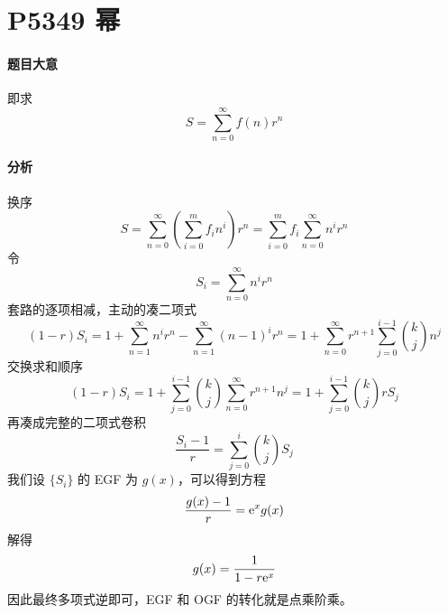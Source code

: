 \section{P5349 幂}

\paragraph{题目大意}

即求
\[ S = \sum_{n=0}^\infty f(n)r^n \]

\paragraph{分析}

换序
\[ S = \sum_{n = 0}^{\infty} \left( \sum_{i = 0}^m f_i n^i \right) r^n
= \sum_{i = 0}^m f_i \sum_{n = 0}^{\infty} n^i r^n \]
令
\[ S_i = \sum_{n = 0}^{\infty} n^i r^n \]
套路的逐项相减，主动的凑二项式
\[ (1 - r) S_i = 1 + \sum_{n = 1}^{\infty} n^i r^n - \sum_{n = 1}^{\infty} (n - 1)^i r^n
= 1 + \sum_{n = 0}^{\infty} r^{n + 1} \sum_{j = 0}^{i - 1} \binom{k}{j} n^j \]
交换求和顺序
\[ (1 - r) S_i = 1 + \sum_{j = 0}^{i - 1} \binom{k}{j} \sum_{n = 0}^{\infty}r^{n + 1} n^j
= 1 + \sum_{j = 0}^{i - 1} \binom{k}{j} r S_j \]
再凑成完整的二项式卷积
\[ \frac{S_i - 1}{r} = \sum_{j = 0}^i \binom{k}{j} S_j \]
我们设 $\{ S_i \}$ 的 EGF 为 $g(x)$，可以得到方程
\[ \frac{g(x) - 1}{r} = {\rm e}^x g(x) \]
解得
\[ g(x) = \frac{1}{1 - r {\rm e}^x} \]
因此最终多项式逆即可，EGF 和 OGF 的转化就是点乘阶乘。


